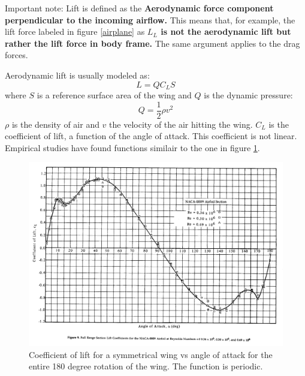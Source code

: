 Important note: Lift is defined as the \textbf{Aerodynamic force component perpendicular to the incoming airflow.} This means that, for example, the lift force labeled in figure \ref {airplane} as \textbf{$L_L$ is not the aerodynamic lift but rather the lift force in body frame.} The same argument applies to the drag forces.

Aerodynamic lift is usually modeled as\cite{nelson}:
\begin{equation}
    L = Q  C_L S
\end{equation}
where $S$ is a reference surface area of the wing and $Q$ is the dynamic pressure:
\begin{equation}
    Q = \frac{1}{2} \rho v^2
\end{equation}
$\rho$ is the density of air and $v$ the velocity of the air hitting the wing.
$C_L$ is the coefficient of lift, a function of the angle of attack.
This coefficient is not linear. Empirical studies have found functions similair to the one in figure \ref{clalpha}.
\begin{figure}[h]
    \center
    \includegraphics[scale=0.15]{aoa_80s.png}
    \caption{Coefficient of lift for a symmetrical wing vs angle of attack for the entire 180 degree rotation of the wing. The function is periodic.}
    \label{clalpha}
\end{figure}

